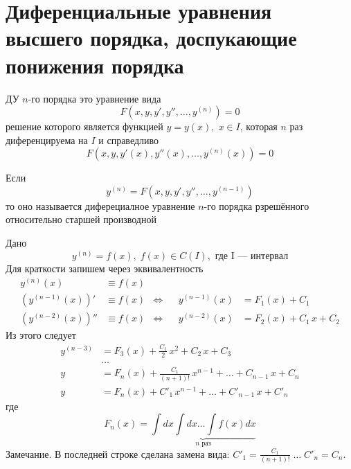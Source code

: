 \author{Tkachuk Andrei}

\section{Диференциальные уравнения высшего порядка, доспукающие понижения порядка}

\begin{Def}
    ДУ $n$-го порядка это уравнение вида 
    \[
        F(x, y, y', y'', \dots, y^{(n)}) = 0
    \]
    решение которого является функцией $y = y(x), \; x \in I$, которая $n$ раз диференцируема на $I$ и справедливо
    \[
        F(x, y, y'(x), y''(x), \dots, y^{(n)}(x)) = 0
    \]
\end{Def}

\begin{Def}
    Если 
    \[
        y^{(n)} = F(x, y, y', y'', \dots, y^{(n - 1)})
    \] 
    то оно называется диферециалное уравнение $n$-го порядка рзрешённого относительно старшей производной
\end{Def}

\begin{Example}
    Дано
    \[
        y^{(n)} = f(x), \; f(x) \in C(I), \text{ где I --- интервал}
    \]
    Для краткости запишем через эквивалентность
    \begin{align*}
        y^{(n)}(x) &\equiv f(x)\\
        (y^{(n-1)}(x))' & \equiv f(x) &\Leftrightarrow& &y^{(n-1)}(x) &= F_1(x) + C_1\\
        (y^{(n-2)}(x))'' & \equiv f(x) &\Leftrightarrow& &y^{(n-2)}(x) &= F_2(x) + C_1 \, x + C_2
    \end{align*}
    Из этого следует
    \begin{align*} 
        y^{(n-3)} &= F_3(x) + \frac{C_1}{2} \, x^2 + C_2 \, x + C_3\\
        &\dots\\
        y &= F_n(x) + \frac{C_1}{(n+1)!}\,x^{n - 1} + \dots + C_{n - 1}\,x + C_n\\
        y &= F_n(x) + C'_1 \, x^{n - 1} + \dots + C'_{n - 1}\,x + C'_n
    \end{align*}
    где
    \[
        F_n(x) = \underbrace{\int dx \int dx \dots \int f(x)dx}_{n \text{ раз}}
    \]
    Замечание. В последней строке сделана замена вида: $C'_1 = \frac{C_1}{(n+1)!} \; \dots \; C'_n = C_n$.\\
\end{Example}


